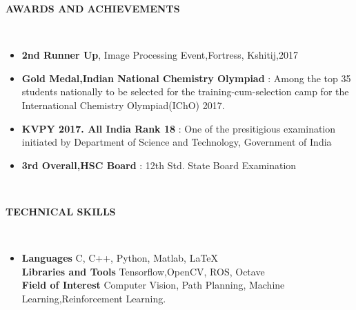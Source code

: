 \documentclass[a4paper,10pt]{article}
\newcommand{\lsep}{-0.5cm}
\newcommand{\resheading}[1]{{\small \colorbox{mygrey}{\begin{minipage}{0.975\textwidth}{\textbf{#1 \vphantom{p\^{E}}}}\end{minipage}}}}
\begin{document}
\resheading{\textbf{AWARDS AND ACHIEVEMENTS} }\\[\lsep]
\begin{itemize}

\item \noindent \textbf{2nd Runner Up}, Image Processing Event,Fortress, Kshitij,2017 
\item \noindent \textbf{Gold Medal,Indian National Chemistry Olympiad} : Among the top 35 students nationally to be selected for the training-cum-selection camp for the International Chemistry Olympiad(IChO) 2017.
\item \noindent \textbf{KVPY 2017. All India Rank 18} :
One of the presitigious examination initiated by Department of Science and Technology, Government of India
\item \noindent \textbf{3rd Overall,HSC Board} : 12th Std. State Board Examination
\end{itemize}

\hspace{0.5cm}\\[-0.2cm]
\resheading{\textbf{TECHNICAL SKILLS} }\\[\lsep]
\begin{itemize}
\item \noindent \textbf{Languages} C, C++, Python, Matlab, {\LaTeX{}} \\
\textbf{Libraries and Tools} Tensorflow,OpenCV, ROS, Octave \\
\textbf{Field of Interest} Computer Vision, Path Planning, Machine Learning,Reinforcement Learning. \\
\end{itemize}
\end{document}
